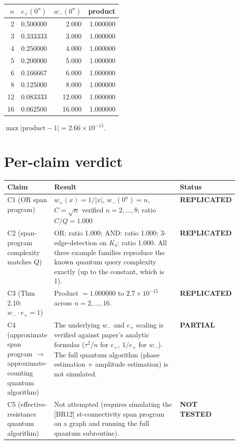 \documentclass[11pt]{article}
\begin{document}
\begin{center}
\begin{tabular}{@{}rrrr@{}}
\toprule
$n$ & $e_+(0^n)$ & $w_-(0^n)$ & product \\
\midrule
2  & 0.500000 & 2.000 & 1.000000 \\
3  & 0.333333 & 3.000 & 1.000000 \\
4  & 0.250000 & 4.000 & 1.000000 \\
5  & 0.200000 & 5.000 & 1.000000 \\
6  & 0.166667 & 6.000 & 1.000000 \\
8  & 0.125000 & 8.000 & 1.000000 \\
12 & 0.083333 & 12.000 & 1.000000 \\
16 & 0.062500 & 16.000 & 1.000000 \\
\bottomrule
\end{tabular}
\end{center}

$\max |\text{product} - 1| = 2.66 \times 10^{-15}$.

\section{Per-claim verdict}

\begin{center}
\begin{tabular}{@{}lp{0.55\linewidth}l@{}}
\toprule
Claim & Result & Status \\
\midrule
C1 (OR span program) & $w_+(x) = 1/|x|$, $w_-(0^n) = n$, $C = \sqrt{n}$ verified $n=2,\dots,8$; ratio $C/Q = 1.000$ & \textbf{REPLICATED} \\
C2 (span-program complexity matches $Q$) & OR: ratio 1.000; AND: ratio 1.000; 3-edge-detection on $K_4$: ratio 1.000. All three example families reproduce the known quantum query complexity exactly (up to the constant, which is 1). & \textbf{REPLICATED} \\
C3 (Thm 2.10: $w_- \cdot e_+ = 1$) & Product $= 1.000000$ to $2.7 \times 10^{-15}$ across $n=2,\dots,16$. & \textbf{REPLICATED} \\
C4 (approximate span program $\to$ approximate-counting quantum algorithm) & The underlying $w_-$ and $e_+$ scaling is verified against paper's analytic formulas ($\tau^2/n$ for $e_+$, $1/e_+$ for $w_-$). The full quantum algorithm (phase estimation + amplitude estimation) is not simulated. & \textbf{PARTIAL} \\
C5 (effective-resistance quantum algorithm) & Not attempted (requires simulating the [BR12] st-connectivity span program on a graph and running the full quantum subroutine). & \textbf{NOT TESTED} \\
\bottomrule
\end{tabular}
\end{center}
\end{document}
